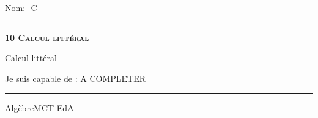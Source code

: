 \documentclass[11pt,a4paper]{article}
\begin{document}
\begin{titlepage}
    \setlength{\topskip}{0mm}
Nom: \hfill \the\year-C
\vspace{0.5cm}
\hrule

    \centering
    \vspace{0.1\textheight}
	{\bfseries\scshape\Huge 10 Calcul littéral\par}
    \vspace{1.5cm}

    {\huge Calcul littéral}
	\vspace{1.5cm}
    
    {\large Je suis capable de :}
    \vspace{1.5cm}
    A COMPLETER

\vfill
\hrule
\vspace{0.5cm}
Algèbre\hfill MCT-EdA

\end{titlepage}
\end{document}
